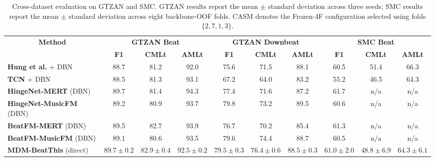 \documentclass{article}
\begin{document}
\begin{table}[t]
\centering
\caption{Cross-dataset evaluation on GTZAN and SMC.
GTZAN results report the mean $\pm$ standard deviation across three seeds;
SMC results report the mean $\pm$ standard deviation across eight
backbone-OOF folds. CASM denotes the Frozen-4F configuration selected
using folds $\{2,7,1,3\}$.}
\label{tab:audiodyn_cross_dataset}
\begingroup
\fontsize{9pt}{11pt}\selectfont
\setlength{\tabcolsep}{1.5pt}
\renewcommand{\arraystretch}{1.0}

\begin{tabular}{l|ccc|ccc|ccc}
\toprule
\multicolumn{1}{c|}{\multirow{2}{*}{\textbf{Method}}}
& \multicolumn{3}{c|}{\textbf{GTZAN Beat}}
& \multicolumn{3}{c|}{\textbf{GTZAN Downbeat}}
& \multicolumn{3}{c}{\textbf{SMC Beat}} \\
\cmidrule(lr){2-4}
\cmidrule(lr){5-7}
\cmidrule(l){8-10}

& \textbf{F1} & \textbf{CMLt} & \textbf{AMLt}
& \textbf{F1} & \textbf{CMLt} & \textbf{AMLt}
& \textbf{F1} & \textbf{CMLt} & \textbf{AMLt} \\
\midrule

\textbf{Hung et al.} + DBN \cite{hung2022modeling}
& 88.7 & 81.2 & 92.0
& 75.6 & 71.5 & 88.1
& 60.5 & 51.4 & 66.3 \\

\textbf{TCN} + DBN  \cite{bock2020deconstruct}
& 88.5 & 81.3 & 93.1
& 67.2 & 64.0 & 83.2
& 55.2 & 46.5 & 64.3 \\

\textbf{HingeNet-MERT} (DBN) \cite{ru2025hingenet}
& 89.7 & 81.4 & 94.3
& 77.4 & 71.6 & 87.2
& 61.7 & n/a & n/a \\

\textbf{HingeNet-MusicFM} (DBN) \cite{ru2025hingenet}
& 89.2 & 80.9 & 93.7
& 79.8 & 73.2 & 89.5
& 60.6 & n/a & n/a \\

\textbf{BeatFM-MERT} (DBN) \cite{ru2025beatfm}
& 89.5 & 82.7 & 93.9
& 76.7 & 70.2 & 85.4
& 61.3 & n/a & n/a \\

\textbf{BeatFM-MusicFM} (DBN) \cite{ru2025beatfm}
& 89.1 & 80.6 & 93.5
& 79.6 & 74.4 & 88.7
& 60.5 & n/a & n/a \\

\textbf{MDM-BeatThis} (direct) \cite{foscarin2026masked}
& $89.7 \pm 0.2$ & $82.9 \pm 0.4$ & $92.5 \pm 0.2$
& $79.5 \pm 0.3$ & $76.4 \pm 0.6$ & $88.5 \pm 0.3$
& $61.0 \pm 2.0$ & $48.8 \pm 6.9$ & $64.3 \pm 6.1$ \\


\end{tabular}
\end{table}
\end{document}
